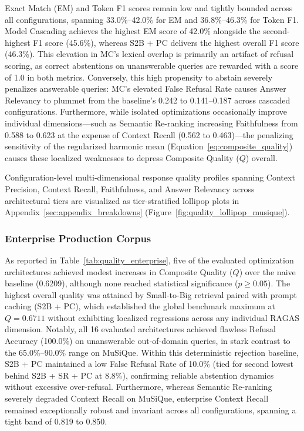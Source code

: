 Exact Match (EM) and Token F1 scores remain low and tightly bounded across all configurations, spanning 33.0\%--42.0\% for EM and 36.8\%--46.3\% for Token F1. Model Cascading achieves the highest EM score of 42.0\% alongside the second-highest F1 score (45.6\%), whereas S2B + PC delivers the highest overall F1 score (46.3\%). This elevation in MC's lexical overlap is primarily an artifact of refusal scoring, as correct abstentions on unanswerable queries are rewarded with a score of 1.0 in both metrics. Conversely, this high propensity to abstain severely penalizes answerable queries: MC's elevated False Refusal Rate causes Answer Relevancy to plummet from the baseline's 0.242 to 0.141--0.187 across cascaded configurations. Furthermore, while isolated optimizations occasionally improve individual dimensions---such as Semantic Re-ranking increasing Faithfulness from 0.588 to 0.623 at the expense of Context Recall (0.562 to 0.463)---the penalizing sensitivity of the regularized harmonic mean (Equation~\ref{eq:composite_quality}) causes these localized weaknesses to depress Composite Quality ($Q$) overall.

Configuration-level multi-dimensional response quality profiles spanning Context Precision, Context Recall, Faithfulness, and Answer Relevancy across architectural tiers are visualized as tier-stratified lollipop plots in Appendix~\ref{sec:appendix_breakdowns} (Figure~\ref{fig:quality_lollipop_musique}).

\subsubsection{Enterprise Production Corpus}
\label{subsubsec:quality_enterprise}

As reported in Table~\ref{tab:quality_enterprise}, five of the evaluated optimization architectures achieved modest increases in Composite Quality ($Q$) over the naive baseline (0.6209), although none reached statistical significance ($p \ge 0.05$). The highest overall quality was attained by Small-to-Big retrieval paired with prompt caching (S2B + PC), which established the global benchmark maximum at $Q = 0.6711$ without exhibiting localized regressions across any individual RAGAS dimension. Notably, all 16 evaluated architectures achieved flawless Refusal Accuracy (100.0\%) on unanswerable out-of-domain queries, in stark contrast to the 65.0\%--90.0\% range on MuSiQue. Within this deterministic rejection baseline, S2B + PC maintained a low False Refusal Rate of 10.0\% (tied for second lowest behind S2B + SR + PC at 8.8\%), confirming reliable abstention dynamics without excessive over-refusal. Furthermore, whereas Semantic Re-ranking severely degraded Context Recall on MuSiQue, enterprise Context Recall remained exceptionally robust and invariant across all configurations, spanning a tight band of 0.819 to 0.850. 

